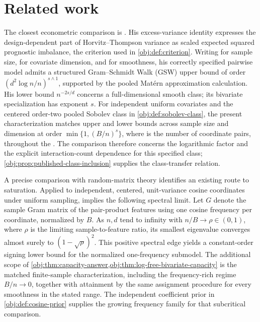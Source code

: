 \section{Related work}

The closest econometric comparison is \citet[Proposition 2.3, equation (2.4), Theorem B.8(ii), Lemma B.9, and Theorem 4.9]{Cytrynbaum2026Limits}. His excess-variance identity expresses the design-dependent part of Horvitz--Thompson variance as scaled expected squared prognostic imbalance, the criterion used in \cref{obj:def:criterion}. Writing  for sample size,  for covariate dimension, and  for smoothness, his correctly specified pairwise model admits a structured Gram--Schmidt Walk (GSW) upper bound of order \((d^2\log n/n)^{s\wedge1}\), supported by the pooled Mat\'ern approximation calculation. His lower bound \(n^{-2s/d}\) concerns a full-dimensional smooth class; its bivariate specialization has exponent \(s\). For independent uniform covariates and the centered order-two pooled Sobolev class in \cref{obj:def:sobolev-class}, the present characterization matches upper and lower bounds across sample size and dimension at order \(\min\{1,(B/n)^s\}\), where  is the number of coordinate pairs, throughout the . The comparison therefore concerns the logarithmic factor and the explicit interaction-count dependence for this specified class; \cref{obj:prop:published-class-inclusion} supplies the class-transfer relation.

A precise comparison with random-matrix theory identifies an existing route to saturation. Applied to independent, centered, unit-variance cosine coordinates under uniform sampling, \citet[Theorem 1.2(2a)]{KoganNandyHuang2024Extremal} implies the following spectral limit. Let \(G\) denote the sample Gram matrix of the pair-product features using one cosine frequency per coordinate, normalized by \(B\). As \(n,d\) tend to infinity with \(n/B\to\rho\in(0,1)\), where \(\rho\) is the limiting sample-to-feature ratio, its smallest eigenvalue converges almost surely to \((1-\sqrt{\rho})^2\). This positive spectral edge yields a constant-order signing lower bound for the normalized one-frequency submodel. The additional scope of \cref{obj:thm:capacity-answer,obj:thm:log-free-bivariate-capacity} is the matched finite-sample characterization, including the frequency-rich regime \(B/n\to0\), together with attainment by the same assignment procedure for every smoothness in the stated range. The independent coefficient prior in \cref{obj:def:cosine-prior} supplies the growing frequency family for that subcritical comparison.

